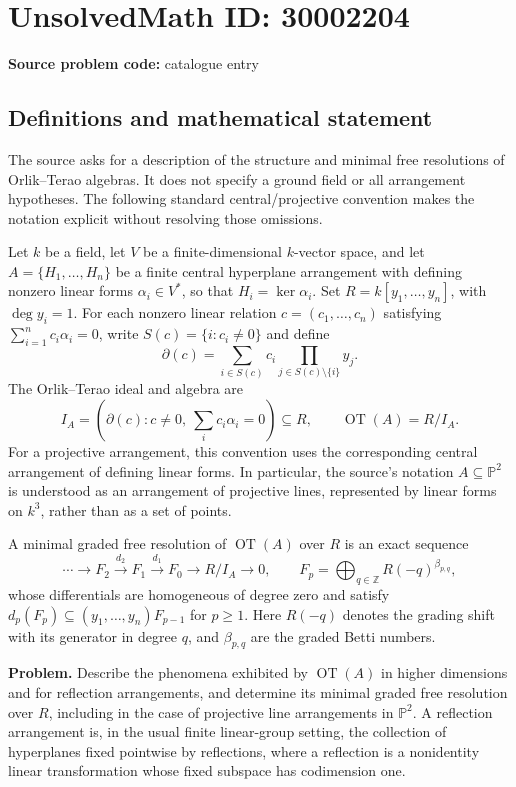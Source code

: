 \documentclass[11pt]{article}
\newcommand{\Z}{\mathbb{Z}}
\begin{document}
\section*{UnsolvedMath ID: 30002204}
\textbf{Source problem code:} catalogue entry
\subsection{Definitions and mathematical statement}
The source asks for a description of the structure and minimal free resolutions of Orlik--Terao algebras. It does not specify a ground field or all arrangement hypotheses. The following standard central/projective convention makes the notation explicit without resolving those omissions.

Let \(k\) be a field, let \(V\) be a finite-dimensional \(k\)-vector space, and let \(A=\{H_1,\ldots,H_n\}\) be a finite central hyperplane arrangement with defining nonzero linear forms \(\alpha_i\in V^*\), so that \(H_i=\ker\alpha_i\). Set \(R=k[y_1,\ldots,y_n]\), with \(\deg y_i=1\). For each nonzero linear relation \(c=(c_1,\ldots,c_n)\) satisfying \(\sum_{i=1}^n c_i\alpha_i=0\), write \(S(c)=\{i:c_i\ne0\}\) and define
\[
\partial(c)=\sum_{i\in S(c)}c_i\prod_{j\in S(c)\setminus\{i\}}y_j.
\]
The Orlik--Terao ideal and algebra are
\[
I_A=(\partial(c):c\ne0,\ \textstyle\sum_i c_i\alpha_i=0)\subseteq R,
\qquad
\operatorname{OT}(A)=R/I_A.
\]
For a projective arrangement, this convention uses the corresponding central arrangement of defining linear forms. In particular, the source's notation \(A\subseteq\mathbb P^2\) is understood as an arrangement of projective lines, represented by linear forms on \(k^3\), rather than as a set of points.

A minimal graded free resolution of \(\operatorname{OT}(A)\) over \(R\) is an exact sequence
\[
\cdots\longrightarrow F_2\xrightarrow{d_2}F_1\xrightarrow{d_1}F_0
\longrightarrow R/I_A\longrightarrow0,
\qquad
F_p=\bigoplus_{q\in\Z}R(-q)^{\beta_{p,q}},
\]
whose differentials are homogeneous of degree zero and satisfy \(d_p(F_p)\subseteq(y_1,\ldots,y_n)F_{p-1}\) for \(p\ge1\). Here \(R(-q)\) denotes the grading shift with its generator in degree \(q\), and \(\beta_{p,q}\) are the graded Betti numbers.

\textbf{Problem.} Describe the phenomena exhibited by \(\operatorname{OT}(A)\) in higher dimensions and for reflection arrangements, and determine its minimal graded free resolution over \(R\), including in the case of projective line arrangements in \(\mathbb P^2\). A reflection arrangement is, in the usual finite linear-group setting, the collection of hyperplanes fixed pointwise by reflections, where a reflection is a nonidentity linear transformation whose fixed subspace has codimension one.
\end{document}
